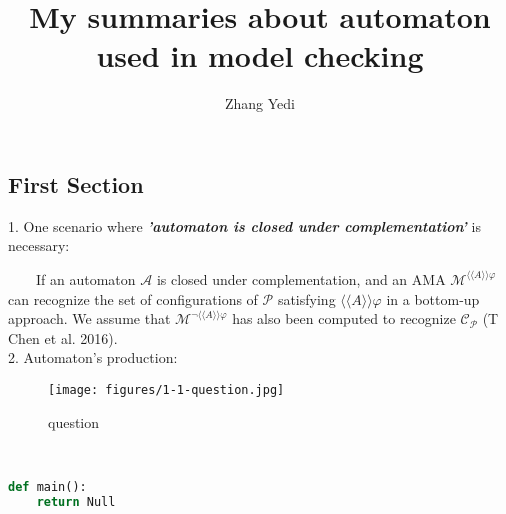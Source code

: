 \documentclass{sciposter}
\title{\huge{My summaries about automaton used in model checking}}
\author{\large{Zhang Yedi}}
\begin{document}
\selectfont

\maketitle



\begin{multicols}{3}
\section{First Section}	
    1. One scenario where \textbf{\emph{'automaton is closed under complementation'}} is necessary:

    ~~~~If an automaton $\mathcal{A}$ is closed under complementation, and an AMA $\mathcal{M}^{\langle\langle A\rangle\rangle\varphi}$ can recognize the set of configurations of $\mathcal{P}$ satisfying $\langle\langle A \rangle\rangle\varphi$ in a bottom-up approach. We assume that $\mathcal{M}^{\neg\langle\langle A \rangle\rangle\varphi }$ has also been computed to recognize $\mathcal{C}_{\mathcal{P}}$ (T Chen et al. 2016).
    \\
    
    2. Automaton's production:
    
    \begin{figure}
  \centering
  \texttt{[image: figures/1-1-question.jpg]}
  \caption{question}
\end{figure}
    ~~~~ 
\begin{lstlisting}[language=Python]
def main():
	return Null
\end{lstlisting}


\end{multicols}
\end{document}
